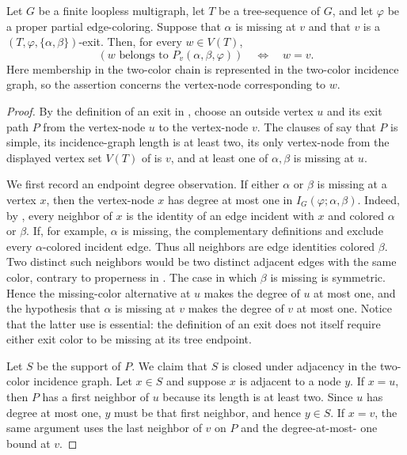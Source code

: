 \begin{lemma}
Let $G$ be a finite loopless multigraph, let $T$ be a tree-sequence of
$G$, and let $\varphi$ be a proper partial edge-coloring.  Suppose that
$\alpha$ is missing at $v$ and that $v$ is a
$(T,\varphi,\{\alpha,\beta\})$-exit.  Then, for every $w\in V(T)$,
\[
 (w\text{ belongs to }P_v(\alpha,\beta,\varphi))
 \quad\Longleftrightarrow\quad w=v.
\]
Here membership in the two-color chain is represented in the two-color
incidence graph, so the assertion concerns the vertex-node corresponding
to $w$.
\end{lemma}
\begin{proof}
By the definition of an exit in , choose an outside
vertex $u$ and its exit path $P$ from the vertex-node $u$ to the
vertex-node $v$.  The clauses of  say that $P$ is
simple, its incidence-graph length is at least two, its only vertex-node
from the displayed vertex set $V(T)$ of
 is $v$, and at least one of
$\alpha,\beta$ is missing at $u$.

We first record an endpoint degree observation.  If either $\alpha$ or
$\beta$ is missing at a vertex $x$, then the vertex-node $x$ has degree at
most one in $I_G(\varphi;\alpha,\beta)$.  Indeed, by
, every neighbor of $x$ is the identity of
an edge incident with $x$ and colored $\alpha$ or $\beta$.  If, for
example, $\alpha$ is missing, the complementary definitions
 and  exclude every
$\alpha$-colored incident edge.  Thus all neighbors are edge identities
colored $\beta$.  Two distinct such neighbors would be two distinct
adjacent edges with the same color, contrary to properness in
.  The case in which $\beta$ is missing is
symmetric.  Hence the missing-color alternative at $u$ makes the degree
of $u$ at most one, and the hypothesis that $\alpha$ is missing at $v$
makes the degree of $v$ at most one.  Notice that the latter use is
essential: the definition of an exit does not itself require either exit
color to be missing at its tree endpoint.

Let $S$ be the support of $P$.  We claim that $S$ is closed under
adjacency in the two-color incidence graph.  Let $x\in S$ and suppose
$x$ is adjacent to a node $y$.  If $x=u$, then $P$ has a first neighbor
of $u$ because its length is at least two.  Since $u$ has degree at most
one, $y$ must be that first neighbor, and hence $y\in S$.  If $x=v$, the
same argument uses the last neighbor of $v$ on $P$ and the degree-at-most-
one bound at $v$.


\end{proof}

